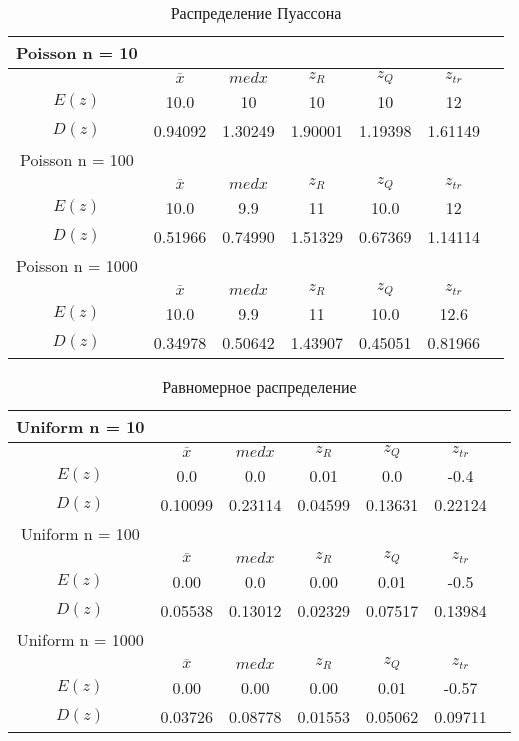 \documentclass[12pt,a4paper]{scrartcl}
\begin{document}
\begin{table}[H]
  \centering
  \begin{tabular}{ | c | c | c | c | c | c | c | }
	\hline
Poisson n = 10 & & & & &  \\ \hline
         & $\overline x$& $med x$& $z_R $ & $z_Q $  &  $z_{tr}$  \\ \hline
         $E(z)$ & 10.0 & 10 & 10 & 10 & 12 \\ \hline
         $D(z)$ & 0.94092 & 1.30249 & 1.90001 & 1.19398 & 1.61149 \\ \hline

Poisson n = 100 & & & & &  \\ \hline
         & $\overline x$& $med x$& $z_R $ & $z_Q $  &  $z_{tr}$  \\ \hline
         $E(z)$ & 10.0 & 9.9 & 11 & 10.0 & 12 \\ \hline
         $D(z)$ & 0.51966 & 0.74990 & 1.51329 & 0.67369 & 1.14114 \\ \hline

Poisson n = 1000 & & & & &  \\ \hline
         & $\overline x$& $med x$& $z_R $ & $z_Q $  &  $z_{tr}$  \\ \hline
         $E(z)$ & 10.0 & 9.9 & 11 & 10.0 & 12.6 \\ \hline
         $D(z)$ & 0.34978 & 0.50642 & 1.43907 & 0.45051 & 0.81966 \\ \hline
	\end{tabular}
  \label{table:poisson_table}
\caption{Распределение Пуассона}
\end{table}

\begin{table}[H]
  \centering
  \begin{tabular}{ | c | c | c | c | c | c | c | }
	\hline
Uniform n = 10 & & & & &  \\ \hline
         & $\overline x$& $med x$& $z_R $ & $z_Q $  &  $z_{tr}$  \\ \hline
         $E(z)$ & 0.0 & 0.0 & 0.01 & 0.0 & -0.4 \\ \hline
         $D(z)$ & 0.10099 & 0.23114 & 0.04599 & 0.13631 & 0.22124 \\ \hline

Uniform n = 100 & & & & &  \\ \hline
         & $\overline x$& $med x$& $z_R $ & $z_Q $  &  $z_{tr}$  \\ \hline
         $E(z)$ & 0.00 & 0.0 & 0.00 & 0.01 & -0.5 \\ \hline
         $D(z)$ & 0.05538 & 0.13012 & 0.02329 & 0.07517 & 0.13984 \\ \hline

Uniform n = 1000 & & & & &  \\ \hline
         & $\overline x$& $med x$& $z_R $ & $z_Q $  &  $z_{tr}$  \\ \hline
         $E(z)$ & 0.00 & 0.00 & 0.00 & 0.01 & -0.57 \\ \hline
         $D(z)$ & 0.03726 & 0.08778 & 0.01553 & 0.05062 & 0.09711 \\ \hline
	\end{tabular}
  \label{table:uniform_table}
\caption{Равномерное распределение}
\end{table}
\end{document}
